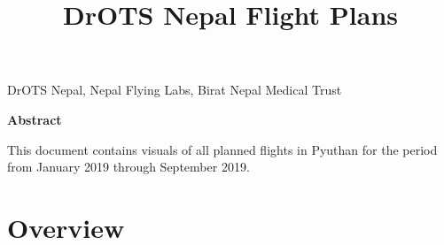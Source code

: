 \documentclass[]{article}
\title{DrOTS Nepal Flight Plans}
\author{}
\date{}
\begin{document}
\maketitle

\begin{center}
\begin{large}

DrOTS Nepal, Nepal Flying Labs, Birat Nepal Medical Trust

\end{large}
\end{center}

\vspace{5mm}

\begin{center}
\textbf{Abstract}  
\end{center}

\vspace{5mm}

\begin{center}
\begin{changemargin}{3cm}{3cm} 

This document contains visuals of all planned flights in Pyuthan for the period from January 2019 through September 2019.

\end{changemargin}
\end{center}

\vspace{20mm}

\noindent{}

\vfill
\null

\vspace{3mm}

\newpage

\section{Overview}\label{overview}
\end{document}

